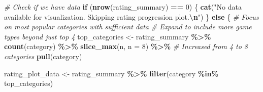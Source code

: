 \documentclass[
]{article}
\newenvironment{Shaded}{\begin{snugshade}}{\end{snugshade}}
\newcommand{\AttributeTok}[1]{\textcolor[rgb]{0.13,0.29,0.53}{#1}}
\newcommand{\CommentTok}[1]{\textcolor[rgb]{0.56,0.35,0.01}{\textit{#1}}}
\newcommand{\ControlFlowTok}[1]{\textcolor[rgb]{0.13,0.29,0.53}{\textbf{#1}}}
\newcommand{\DecValTok}[1]{\textcolor[rgb]{0.00,0.00,0.81}{#1}}
\newcommand{\FunctionTok}[1]{\textcolor[rgb]{0.13,0.29,0.53}{\textbf{#1}}}
\newcommand{\NormalTok}[1]{#1}
\newcommand{\OtherTok}[1]{\textcolor[rgb]{0.56,0.35,0.01}{#1}}
\newcommand{\SpecialCharTok}[1]{\textcolor[rgb]{0.81,0.36,0.00}{\textbf{#1}}}
\newcommand{\StringTok}[1]{\textcolor[rgb]{0.31,0.60,0.02}{#1}}
\begin{document}
\begin{Shaded}
\begin{Highlighting}[]
\CommentTok{\# Check if we have data}
\ControlFlowTok{if}\NormalTok{ (}\FunctionTok{nrow}\NormalTok{(rating\_summary) }\SpecialCharTok{==} \DecValTok{0}\NormalTok{) \{}
    \FunctionTok{cat}\NormalTok{(}\StringTok{"No data available for visualization. Skipping rating progression plot.}\SpecialCharTok{\textbackslash{}n}\StringTok{"}\NormalTok{)}
\NormalTok{\} }\ControlFlowTok{else}\NormalTok{ \{}
    \CommentTok{\# Focus on most popular categories with sufficient data}
    \CommentTok{\# Expand to include more game types beyond just top 4}
\NormalTok{    top\_categories }\OtherTok{\textless{}{-}}\NormalTok{ rating\_summary }\SpecialCharTok{\%\textgreater{}\%}
        \FunctionTok{count}\NormalTok{(category) }\SpecialCharTok{\%\textgreater{}\%}
        \FunctionTok{slice\_max}\NormalTok{(n, }\AttributeTok{n =} \DecValTok{8}\NormalTok{) }\SpecialCharTok{\%\textgreater{}\%}  \CommentTok{\# Increased from 4 to 8 categories}
        \FunctionTok{pull}\NormalTok{(category)}

\NormalTok{    rating\_plot\_data }\OtherTok{\textless{}{-}}\NormalTok{ rating\_summary }\SpecialCharTok{\%\textgreater{}\%}
        \FunctionTok{filter}\NormalTok{(category }\SpecialCharTok{\%in\%}\NormalTok{ top\_categories)}


\end{Highlighting}
\end{Shaded}
\end{document}
